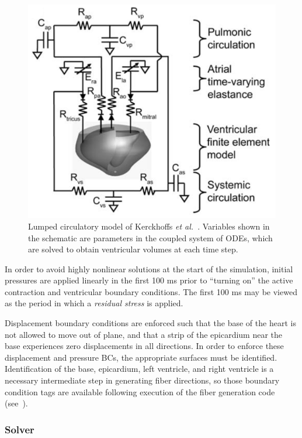 \begin{figure}[ht]
\centering
		\includegraphics[scale=0.3]{media/bcs.png}
\caption{Lumped circulatory model of Kerckhoffs \textit{et al.}~\cite{kerckhoffs_2006}. Variables shown in the schematic are parameters in the coupled system of ODEs, which are solved to obtain ventricular volumes at each time step.}
\label{fig:bcs}
\end{figure}

In order to avoid highly nonlinear solutions at the start of the simulation, initial pressures are applied linearly in the first 100 ms prior to ``turning on'' the active contraction and ventricular boundary conditions. The first 100 ms may be viewed as the period in which a \textit{residual stress} is applied.

Displacement boundary conditions are enforced such that the base of the heart is not allowed to move out of plane, and that a strip of the epicardium near the base experiences zero displacements in all directions. In order to enforce these displacement and pressure BCs, the appropriate surfaces must be identified. Identification of the base, epicardium, left ventricle, and right ventricle is a necessary intermediate step in generating fiber directions, so those boundary condition tags are available following execution of the fiber generation code (see~).

\subsubsection{Solver}
\label{Solver}

